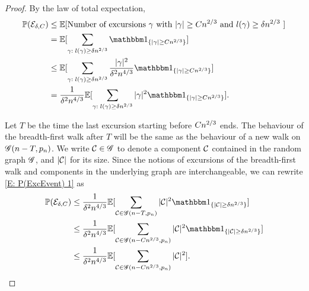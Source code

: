 \begin{proof}
	By the law of total expectation,
	\begin{equation} \label{E: P(ExcEvent) 1}
	\begin{aligned}
	\Prob(\ExcursionEvent) 
	&\leq \Exp{ \text{Number of excursions $\gamma$ with $|\gamma| \geq C\n{2}{3}$ and $l(\gamma) \geq \delta\n{2}{3}$ } } \\
	&= \Exp{ \sum_{\gamma: \; l(\gamma) \geq \delta\n{2}{3}} \Ind{\{|\gamma| \geq C\n{2}{3} \} } } \\
	&\leq \Exp{ \sum_{\gamma: \; l(\gamma) \geq \delta\n{2}{3}} \frac{|\gamma|^2}{\delta^2\n{4}{3}} \Ind{\{|\gamma| \geq C\n{2}{3} \} }} \\
	&= \frac{1}{\delta^2\n{4}{3}} \Exp{ \sum_{\gamma: \; l(\gamma) \geq \delta\n{2}{3}}  |\gamma|^2 \Ind{\{|\gamma| \geq C\n{2}{3} \} }}.
	\end{aligned}
	\end{equation}
	
	Let $T$ be the time the last excursion starting before $Cn^{2 / 3}$ ends.
	The behaviour of the breadth-first walk after $T$ will be the same as the behaviour of a new walk on $\mathscr{G}(n-T, p_n)$.
	We write $\mathcal{C} \in \mathscr{G}$ to denote a component $\mathcal{C}$ contained in the random graph $\mathscr{G}$,
	and $|\mathcal{C}|$ for its size.
	Since the notions of excursions of the breadth-first walk and components in the underlying graph are interchangeable,
	we can rewrite \eqref{E: P(ExcEvent) 1} as
	\begin{equation} \label{E: P(ExcEvent) 2}
	\begin{aligned}
	\Prob(\ExcursionEvent) 
	&\leq \frac{1}{\delta^2\n{4}{3}} \Exp{ \sum_{\Ccal \in \Gcal(n-T, \p)}  |\Ccal|^2 \Ind{\{|\Ccal| \geq \delta\n{2}{3} \} }} \\
	&\leq \frac{1}{\delta^2\n{4}{3}} \Exp{ \sum_{\Ccal \in \Gcal(n-C\n{2}{3}, \p)}  |\Ccal|^2 \Ind{\{|\Ccal| \geq \delta\n{2}{3} \} }} \\
	&\leq \frac{1}{\delta^2\n{4}{3}} \Exp{ \sum_{\Ccal \in \Gcal(n-C\n{2}{3}, \p)}  |\Ccal|^2 }.
	\end{aligned}
	\end{equation}
	

\end{proof}
